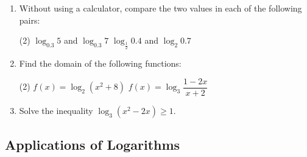 \documentclass{report}
\begin{document}
        \newpage
        \begin{enumerate}
            \item Without using a calculator, compare the two values in each of the following pairs:
            \begin{tasks}[label=(\alph*)](2)
                \task $\log _{0.3} 5$ and $\log _{0.3} 7$
                \task $\log _{\frac{1}{2}} 0.4$ and $\log _2 0.7$
            \end{tasks}
            \item Find the domain of the following functions:
            \begin{tasks}[label=(\alph*)](2)
                \task $f(x)=\log _2\left(x^2+8\right)$
                \task $f(x)=\log _3 \dfrac{1-2 x}{x+2}$
            \end{tasks}
            \item Solve the inequality $\log _3\left(x^2-2 x\right) \geq 1$.
        \end{enumerate}

        \subsection*{Applications of Logarithms}
\end{document}
